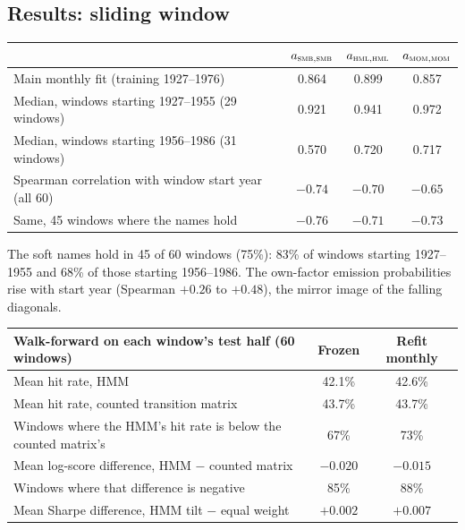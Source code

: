 \documentclass[11pt]{article}
\begin{document}
\subsection{Results: sliding window}
\begin{center}
\small
\begin{tabular}{lccc}
\toprule
 & $a_{\textsc{smb},\textsc{smb}}$ & $a_{\textsc{hml},\textsc{hml}}$ & $a_{\textsc{mom},\textsc{mom}}$ \\
\midrule
Main monthly fit (training 1927--1976) & 0.864 & 0.899 & 0.857 \\
Median, windows starting 1927--1955 (29 windows) & 0.921 & 0.941 & 0.972 \\
Median, windows starting 1956--1986 (31 windows) & 0.570 & 0.720 & 0.717 \\
Spearman correlation with window start year (all 60) & $-0.74$ & $-0.70$ & $-0.65$ \\
Same, 45 windows where the names hold & $-0.76$ & $-0.71$ & $-0.73$ \\
\bottomrule
\end{tabular}
\end{center}
The soft names hold in 45 of 60 windows (75\%): 83\% of windows starting 1927--1955 and 68\% of those starting 1956--1986. The own-factor emission probabilities rise with start year (Spearman $+0.26$ to $+0.48$), the mirror image of the falling diagonals.

\begin{center}
\small
\begin{tabular}{lcc}
\toprule
Walk-forward on each window's test half (60 windows) & Frozen & Refit monthly \\
\midrule
Mean hit rate, HMM & 42.1\% & 42.6\% \\
Mean hit rate, counted transition matrix & 43.7\% & 43.7\% \\
Windows where the HMM's hit rate is below the counted matrix's & 67\% & 73\% \\
Mean log-score difference, HMM $-$ counted matrix & $-0.020$ & $-0.015$ \\
Windows where that difference is negative & 85\% & 88\% \\
Mean Sharpe difference, HMM tilt $-$ equal weight & $+0.002$ & $+0.007$ \\
\bottomrule
\end{tabular}
\end{center}
\end{document}
